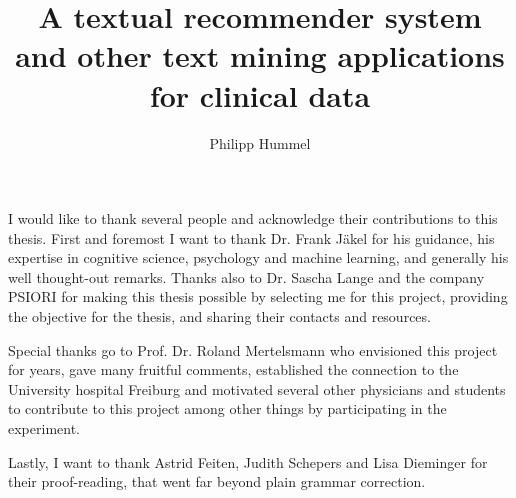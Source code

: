 \documentclass[11pt, twoside, openright, utf8, bachelor, english, subfiles]{base/thesis}
\institute{Institute of Cognitive Science}
\title{A textual recommender system and other text mining applications for clinical data}
\author{Philipp Hummel}
\begin{document}
\maketitle

\begin{abstract}

\end{abstract}

\begin{acknowledgements}
I would like to thank several people and acknowledge their contributions to this thesis. First and foremost I want to thank Dr. Frank Jäkel for his guidance, his expertise in cognitive science, psychology and machine learning, and generally his well thought-out remarks. Thanks also to Dr. Sascha Lange and the company PSIORI for making this thesis possible by selecting me for this project, providing the objective for the thesis, and sharing their contacts and resources.

Special thanks go to Prof. Dr. Roland Mertelsmann who envisioned this project for years, gave many fruitful comments, established the connection to the University hospital Freiburg and motivated several other physicians and students to contribute to this project among other things by participating in the experiment.

Lastly, I want to thank Astrid Feiten, Judith Schepers and Lisa Dieminger for their proof-reading, that went far beyond plain grammar correction.
\end{acknowledgements}

\tableofcontents

\mainpart






%
%
%
%

\appendix






\declaration
\end{document}
